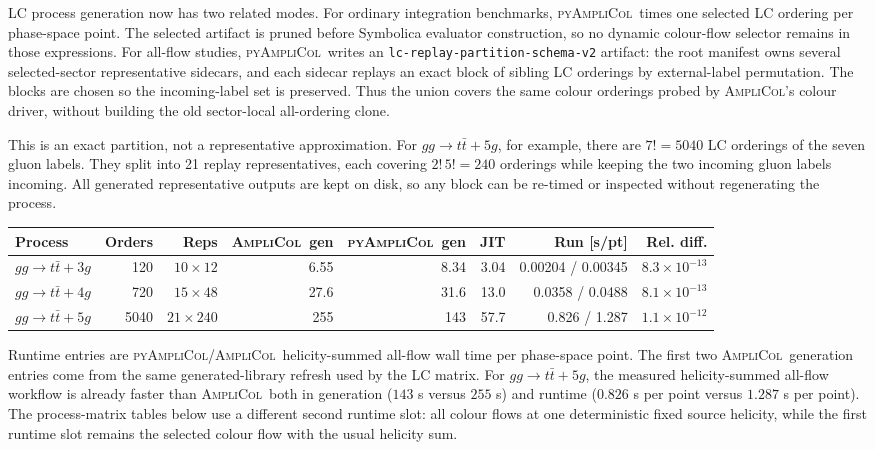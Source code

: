 \documentclass[10pt]{article}
\newcommand{\AC}{\textsc{AmpliCol}}
\newcommand{\PAC}{\textsc{pyAmpliCol}}
\begin{document}
LC process generation now has two related modes.  For ordinary integration
benchmarks, \PAC\ times one selected LC ordering per phase-space point.  The
selected artifact is pruned before Symbolica evaluator construction, so no
dynamic colour-flow selector remains in those expressions.  For all-flow
studies, \PAC\ writes an \texttt{lc-replay-partition-schema-v2} artifact: the
root manifest owns several selected-sector representative sidecars, and each
sidecar replays an exact block of sibling LC orderings by external-label
permutation.  The blocks are chosen so the incoming-label set is preserved.
Thus the union covers the same colour orderings probed by \AC's colour driver,
without building the old sector-local all-ordering clone.

This is an exact partition, not a representative approximation.  For
\(gg\to t\bar t+5g\), for example, there are \(7!=5040\) LC orderings of the
seven gluon labels.  They split into 21 replay representatives, each covering
\(2!\,5!=240\) orderings while keeping the two incoming gluon labels incoming.
All generated representative outputs are kept on disk, so any block can be
re-timed or inspected without regenerating the process.

\begin{center}
\begingroup
\scriptsize
\setlength{\tabcolsep}{3pt}
\begin{tabular}{@{}L{1.35in}rrrrrrr@{}}
\toprule
Process & Orders & Reps & \AC\ gen & \PAC\ gen & JIT & Run [s/pt] & Rel. diff. \\
\midrule
\(gg\to t\bar t+3g\) & 120 & \(10\times12\) & 6.55 & 8.34 & 3.04 & 0.00204 / 0.00345 & \(8.3\times10^{-13}\) \\
\(gg\to t\bar t+4g\) & 720 & \(15\times48\) & 27.6 & 31.6 & 13.0 & 0.0358 / 0.0488 & \(8.1\times10^{-13}\) \\
\(gg\to t\bar t+5g\) & 5040 & \(21\times240\) & 255 & 143 & 57.7 & 0.826 / 1.287 & \(1.1\times10^{-12}\) \\
\bottomrule
\end{tabular}
\endgroup
\end{center}

\noindent\footnotesize Runtime entries are \PAC/\AC\ helicity-summed all-flow
wall time per phase-space point.  The first two \AC\ generation entries come
from the same generated-library refresh used by the LC matrix.  For
\(gg\to t\bar t+5g\), the measured
helicity-summed all-flow workflow is already faster than \AC\ both in
generation (\(143\) s versus \(255\) s) and runtime (\(0.826\) s per point
versus \(1.287\) s per point).  The process-matrix tables below use a different
second runtime slot: all colour flows at one deterministic fixed source
helicity, while the first runtime slot remains the selected colour flow with
the usual helicity sum.
\end{document}
